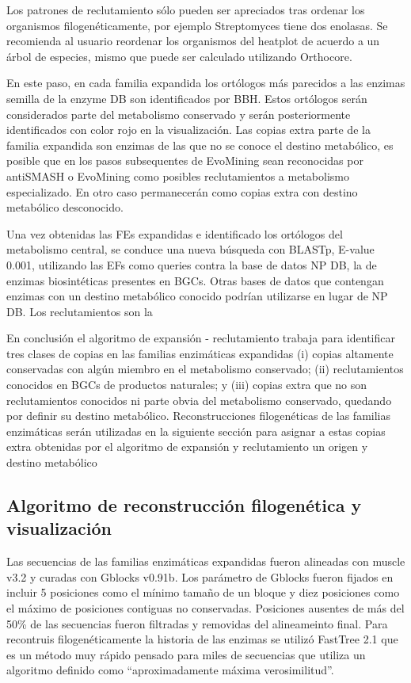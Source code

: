 \documentclass[12pt,twoside]{reedthesis}
\begin{document}
  Los patrones de reclutamiento sólo pueden ser apreciados tras ordenar
  los organismos filogenéticamente, por ejemplo Streptomyces tiene dos
  enolasas. Se recomienda al usuario reordenar los organismos del heatplot
  de acuerdo a un árbol de especies, mismo que puede ser calculado
  utilizando Orthocore.
  
  En este paso, en cada familia expandida los ortólogos más parecidos a
  las enzimas semilla de la enzyme DB son identificados por BBH. Estos
  ortólogos serán considerados parte del metabolismo conservado y serán
  posteriormente identificados con color rojo en la visualización. Las
  copias extra parte de la familia expandida son enzimas de las que no se
  conoce el destino metabólico, es posible que en los pasos subsequentes
  de EvoMining sean reconocidas por antiSMASH o EvoMining como posibles
  reclutamientos a metabolismo especializado. En otro caso permanecerán
  como copias extra con destino metabólico desconocido.
  
  Una vez obtenidas las FEs expandidas e identificado los ortólogos del
  metabolismo central, se conduce una nueva búsqueda con BLASTp, E-value
  0.001, utilizando las EFs como queries contra la base de datos NP DB, la
  de enzimas biosintéticas presentes en BGCs. Otras bases de datos que
  contengan enzimas con un destino metabólico conocido podrían utilizarse
  en lugar de NP DB. Los reclutamientos son la
  
  En conclusión el algoritmo de expansión - reclutamiento trabaja para
  identificar tres clases de copias en las familias enzimáticas expandidas
  (i) copias altamente conservadas con algún miembro en el metabolismo
  conservado; (ii) reclutamientos conocidos en BGCs de productos
  naturales; y (iii) copias extra que no son reclutamientos conocidos ni
  parte obvia del metabolismo conservado, quedando por definir su destino
  metabólico. Reconstrucciones filogenéticas de las familias enzimáticas
  serán utilizadas en la siguiente sección para asignar a estas copias
  extra obtenidas por el algoritmo de expansión y reclutamiento un origen
  y destino metabólico
  
  \subsection{Algoritmo de reconstrucción filogenética y
  visualización}\label{algoritmo-de-reconstruccion-filogenetica-y-visualizacion-1}
  
  Las secuencias de las familias enzimáticas expandidas fueron alineadas
  con muscle v3.2 y curadas con Gblocks v0.91b. Los parámetro de Gblocks
  fueron fijados en incluir 5 posiciones como el mínimo tamaño de un
  bloque y diez posiciones como el máximo de posiciones contiguas no
  conservadas. Posiciones ausentes de más del 50\% de las secuencias
  fueron filtradas y removidas del alineameinto final. Para recontruis
  filogenéticamente la historia de las enzimas se utilizó FastTree 2.1 que
  es un método muy rápido pensado para miles de secuencias que utiliza un
  algoritmo definido como ``aproximadamente máxima verosimilitud''.
  
\end{document}
